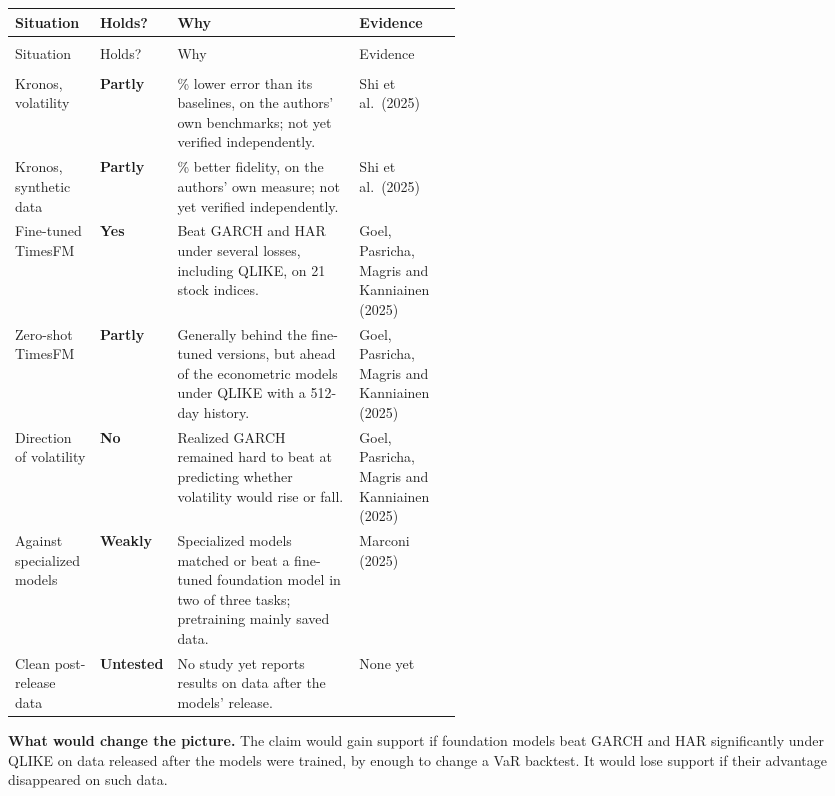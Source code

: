{\small
\begin{longtable}{@{}>{\raggedright\arraybackslash}p{0.19\linewidth}>{\raggedright\arraybackslash}p{0.10\linewidth}>{\raggedright\arraybackslash}p{}>{\raggedright\arraybackslash}p{0.23\linewidth}@{}}
\toprule
Situation & Holds? & Why & Evidence \\
\midrule
\endfirsthead
\multicolumn{4}{@{}l}{\emph{(continued)}} \\
\toprule
Situation & Holds? & Why & Evidence \\
\midrule
\endhead
\midrule
\multicolumn{4}{r@{}}{\emph{(continued on the next page)}} \\
\endfoot
\bottomrule
\endlastfoot
Kronos, volatility & \textbf{Partly} & 9\% lower error than its baselines, on the authors' own benchmarks; not yet verified independently. & Shi et al.\ (2025) \\
\addlinespace[3pt]
Kronos, synthetic data & \textbf{Partly} & 22\% better fidelity, on the authors' own measure; not yet verified independently. & Shi et al.\ (2025) \\
\addlinespace[3pt]
Fine-tuned TimesFM & \textbf{Yes} & Beat GARCH and HAR under several losses, including QLIKE, on 21 stock indices. & Goel, Pasricha, Magris and Kanniainen (2025) \\
\addlinespace[3pt]
Zero-shot TimesFM & \textbf{Partly} & Generally behind the fine-tuned versions, but ahead of the econometric models under QLIKE with a 512-day history. & Goel, Pasricha, Magris and Kanniainen (2025) \\
\addlinespace[3pt]
Direction of volatility & \textbf{No} & Realized GARCH remained hard to beat at predicting whether volatility would rise or fall. & Goel, Pasricha, Magris and Kanniainen (2025) \\
\addlinespace[3pt]
Against specialized models & \textbf{Weakly} & Specialized models matched or beat a fine-tuned foundation model in two of three tasks; pretraining mainly saved data. & Marconi (2025) \\
\addlinespace[3pt]
Clean post-release data & \textbf{Untested} & No study yet reports results on data after the models' release. & None yet \\
\end{longtable}
}

\textbf{What would change the picture.} The claim would gain support if foundation models beat GARCH and HAR significantly under QLIKE on data released after the models were trained, by enough to change a VaR backtest. It would lose support if their advantage disappeared on such data.

